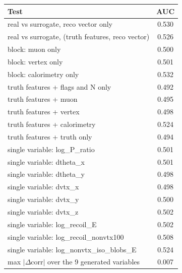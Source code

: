 \begin{tabular}{lc}
\toprule
Test & AUC \\
\midrule
real vs surrogate, reco vector only & 0.530 \\
real vs surrogate, (truth features, reco vector) & 0.526 \\
\midrule
block: muon only & 0.500 \\
block: vertex only & 0.501 \\
block: calorimetry only & 0.532 \\
truth features + flags and N only & 0.492 \\
truth features + muon & 0.495 \\
truth features + vertex & 0.498 \\
truth features + calorimetry & 0.524 \\
truth features + truth only & 0.494 \\
single variable: log\_P\_ratio & 0.501 \\
single variable: dtheta\_x & 0.501 \\
single variable: dtheta\_y & 0.498 \\
single variable: dvtx\_x & 0.498 \\
single variable: dvtx\_y & 0.500 \\
single variable: dvtx\_z & 0.502 \\
single variable: log\_recoil\_E & 0.502 \\
single variable: log\_recoil\_nonvtx100 & 0.508 \\
single variable: log\_nonvtx\_iso\_blobs\_E & 0.524 \\
\midrule
max $|\Delta$corr$|$ over the 9 generated variables & 0.007 \\
\bottomrule
\end{tabular}
